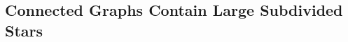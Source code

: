 \documentclass[kpfonts,lotsofwhite]{patmorin}
\newcommand{\defn}[1]{\textcolor{Maroon}{\emph{#1}}}
\DeclarePairedDelimiter{\floor}{\lfloor}{\rfloor}
\renewcommand{\ge}{\geqslant}
\renewcommand{\geq}{\geqslant}
\newcommand{\PP}{\mathcal{P}}
\theoremstyle{plain}
\newtheorem{lem}[thm]{Lemma}
\theoremstyle{definition}
\begin{document}
\subsection{Connected Graphs Contain Large Subdivided Stars}








\end{document}
